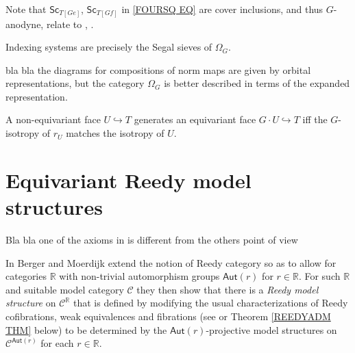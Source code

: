 \documentclass[a4paper,10pt,draft]{article}%
\begin{document}
\begin{remark}
	Note that $\mathsf{Sc}_{T[Ge]}$, $\mathsf{Sc}_{T[Gf]}$
	in \eqref{FOURSQ EQ}
	are cover inclusions, and thus $G$-anodyne, relate to 
	\cite[\S 6.2]{Rez10}, \cite[\S 10]{Rez01}.
\end{remark}


\begin{remark}
Indexing systems are precisely the Segal sieves of $\Omega_G$.
\end{remark}

\begin{remark}
{\color{blue} bla bla} the diagrams for compositions of norm maps are given by orbital representations, but the category $\Omega_G$ is better described in terms of the expanded representation.
\end{remark}




\begin{lemma}
	A non-equivariant face $U \hookrightarrow T$ generates an equivariant face $G\cdot U \hookrightarrow T$ iff the $G$-isotropy of $r_U$ matches the isotropy of $U$.
\end{lemma}






\newpage


\appendix

\section{Equivariant Reedy model structures}


{\color{blue} Bla bla one of the axioms in \cite{BM11} is different from the others point of view}

In \cite{BM11} Berger and Moerdijk extend the notion of Reedy category so as to allow for categories $\mathbb{R}$
 with non-trivial automorphism groups 
 $\mathsf{Aut}(r)$ for $r \in \mathbb{R}$.
For such $\mathbb{R}$ and suitable model category $\mathcal{C}$ they then show that there is a 
\textit{Reedy model structure}
on $\mathcal{C}^{\mathbb{R}}$
that is defined by modifying the usual characterizations of
Reedy cofibrations, weak equivalences and fibrations
(see \cite[Thm. 1.6]{BM11} or
Theorem \ref{REEDYADM THM} below)
 to be determined by the $\mathsf{Aut}(r)$-projective model structures
on $\mathcal{C}^{\mathsf{Aut}(r)}$
for each $r \in \mathbb{R}$. 
\end{document}
